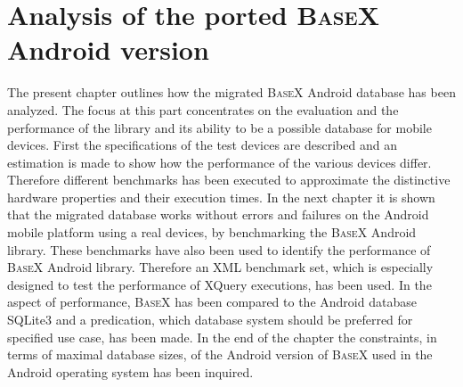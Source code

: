 \chapter{Analysis of the ported \textsc{BaseX} Android version}
\label{cha:analysis}
The present chapter outlines how the migrated \textsc{BaseX} Android database has been analyzed.
The focus at this part concentrates on the evaluation and the performance of the library and its ability to be a possible database for mobile devices.
First the specifications of the test devices are described and an estimation is made to show how the performance of the various devices differ.
Therefore different benchmarks has been executed to approximate the distinctive hardware properties and their execution times.
In the next chapter it is shown that the migrated database works without errors and failures on the Android mobile platform using a real devices, by benchmarking the \textsc{BaseX} Android library.
These benchmarks have also been used to identify the performance of \textsc{BaseX} Android library. 
Therefore an XML benchmark set, which is especially designed to test the performance of XQuery executions, has been used.
In the aspect of performance, \textsc{BaseX} has been compared to the Android database SQLite3 and a predication, which database system should be preferred for specified use case, has been made.
In the end of the chapter the constraints, in terms of maximal database sizes, of the Android version of \textsc{BaseX} used in the Android operating system has been inquired.

